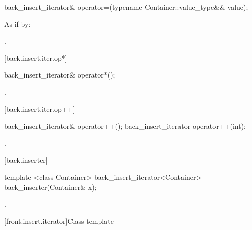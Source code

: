 %
\begin{itemdecl}
back_insert_iterator& operator=(typename Container::value_type&& value);
\end{itemdecl}

\begin{itemdescr}
\pnum
\effects
As if by: 

\pnum
\returns
{}.
\end{itemdescr}

[back.insert.iter.op*]{}

%
\begin{itemdecl}
back_insert_iterator& operator*();
\end{itemdecl}

\begin{itemdescr}
\pnum
\returns
{}.
\end{itemdescr}

[back.insert.iter.op++]{}

%
\begin{itemdecl}
back_insert_iterator& operator++();
back_insert_iterator  operator++(int);
\end{itemdecl}

\begin{itemdescr}
\pnum
\returns
{}.
\end{itemdescr}

[back.inserter]{ }

%
\begin{itemdecl}
template <class Container>
  back_insert_iterator<Container> back_inserter(Container& x);
\end{itemdecl}

\begin{itemdescr}
\pnum
\returns
{}.
\end{itemdescr}

[front.insert.iterator]{Class template }

